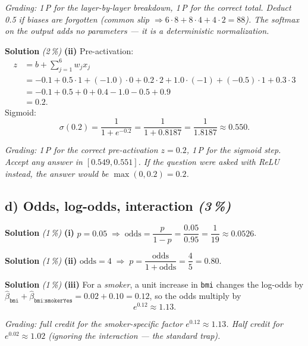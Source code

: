 \documentclass[11pt,a4paper]{article}
\newcommand{\subpoints}[1]{\textit{(#1\,\%)}}
\newcommand{\sol}{\noindent\textbf{Solution}}
\begin{document}
\noindent\emph{Grading: 1\,P for the layer-by-layer breakdown, 1\,P for the correct total.
Deduct 0.5 if biases are forgotten (common slip $\Rightarrow 6\cdot 8 + 8\cdot 4 + 4\cdot 2 = 88$).
The softmax on the output adds no parameters --- it is a deterministic normalization.}

\medskip
\sol{} \subpoints{2} \textbf{(ii)} Pre-activation:
\begin{align*}
z &= b + \sum_{j=1}^{6} w_j x_j \\
  &= -0.1 + 0.5\cdot 1 + (-1.0)\cdot 0 + 0.2\cdot 2 + 1.0\cdot(-1) + (-0.5)\cdot 1 + 0.3\cdot 3 \\
  &= -0.1 + 0.5 + 0 + 0.4 - 1.0 - 0.5 + 0.9 \\
  &= 0.2.
\end{align*}
Sigmoid:
$$\sigma(0.2) = \frac{1}{1+e^{-0.2}} = \frac{1}{1+0.8187} = \frac{1}{1.8187} \approx \boxed{0.550}.$$

\noindent\emph{Grading: 1\,P for the correct pre-activation $z=0.2$, 1\,P for the sigmoid step.
Accept any answer in $[0.549, 0.551]$. If the question were asked with ReLU instead, the answer
would be $\max(0,0.2)=0.2$.}

\subsection*{d) Odds, log-odds, interaction \subpoints{3}}

\sol{} \subpoints{1} \textbf{(i)} $p=0.05\;\Rightarrow\;\text{odds}=\dfrac{p}{1-p}=\dfrac{0.05}{0.95}=\dfrac{1}{19}\approx \boxed{0.0526}$.

\medskip
\sol{} \subpoints{1} \textbf{(ii)} $\text{odds}=4\;\Rightarrow\;p=\dfrac{\text{odds}}{1+\text{odds}}=\dfrac{4}{5}=\boxed{0.80}$.

\medskip
\sol{} \subpoints{1} \textbf{(iii)} For a \emph{smoker}, a unit increase in \texttt{bmi} changes
the log-odds by
$\hat\beta_{\texttt{bmi}}+\hat\beta_{\texttt{bmi:smokerYes}}=0.02+0.10=0.12$,
so the odds multiply by
$$e^{0.12}\approx \boxed{1.13}.$$

\noindent\emph{Grading: full credit for the smoker-specific factor $e^{0.12}\approx 1.13$. Half
credit for $e^{0.02}\approx 1.02$ (ignoring the interaction --- the standard trap).}
\end{document}
